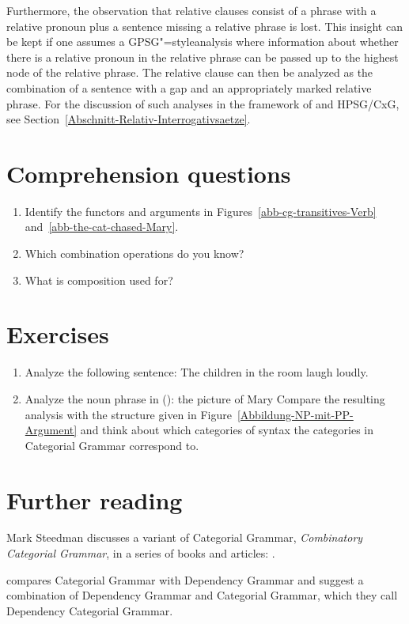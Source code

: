 Furthermore, the observation that relative clauses consist of a phrase with a relative pronoun plus a sentence missing a relative phrase
is lost. This insight can be kept if one assumes a GPSG"=style\indexgpsg analysis where information about whether there is a relative pronoun
in the relative phrase can be passed up to the highest node of the relative phrase.
The relative clause can then be analyzed as the combination of a sentence with a gap and an appropriately marked relative phrase.
For the discussion of such analyses in the framework of \gbt and HPSG/CxG, see Section~\ref{Abschnitt-Relativ-Interrogativsaetze}.

\section*{Comprehension questions}

\begin{enumerate}
\item Identify the functors and arguments in Figures~\ref{abb-cg-transitives-Verb}
  and~\ref{abb-the-cat-chased-Mary}.
\item Which combination operations do you know?
\item What is composition used for?
\end{enumerate}
\pagebreak

\section*{Exercises}

\begin{enumerate}
\item Analyze the following sentence:
\ea
The children in the room laugh loudly.
\z
\item\label{ue-Xbar-CG} Analyze the noun phrase in ():
\ea
the picture of Mary
\z
Compare the resulting analysis with the structure given in Figure~\vref{Abbildung-NP-mit-PP-Argument} and think about which
categories of \xbar syntax the categories in Categorial Grammar correspond to. 
\end{enumerate}

\section*{Further reading}

\begin{sloppypar}
Mark Steedman discusses a variant of Categorial Grammar, \emph{Combinatory Categorial Grammar}, in a series of books and articles:
\citet{Steedman91a,Steedman2000a-u,SB2006a-u}.
\end{sloppypar}
\citet{Lobin2003a} compares Categorial Grammar with Dependency Grammar and \citet{PB93a} suggest a
combination of Dependency Grammar and Categorial Grammar, which they call Dependency Categorial Grammar.

